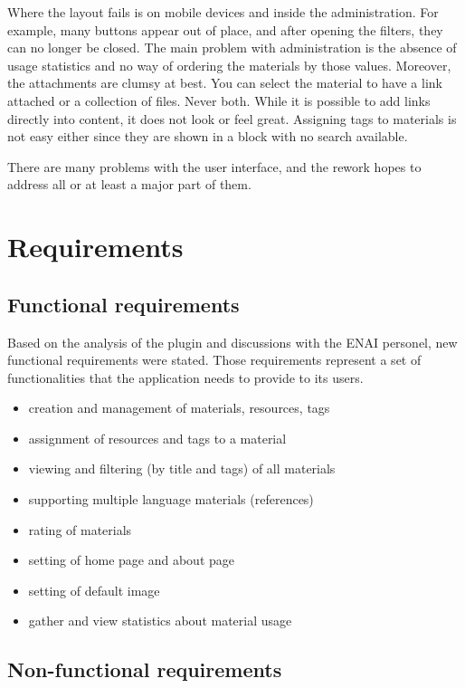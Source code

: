 \documentclass[
  digital,     %
  oneside,     %
  nosansbold,  %
  colorbold, %
  lof,         %
  lot,         %
]{fithesis4}
\begin{document}
Where the layout fails is on mobile devices and inside the administration. For example, many buttons appear out of place, and after opening the filters, they can no longer be closed. The main problem with administration is the absence of usage statistics and no way of ordering the materials by those values. Moreover, the attachments are clumsy at best. You can select the material to have a link attached or a collection of files. Never both. While it is possible to add links directly into content, it does not look or feel great. Assigning tags to materials is not easy either since they are shown in a block with no search available.

There are many problems with the user interface, and the rework hopes to address all or at least a major part of them.

\section{Requirements}

\subsection{Functional requirements}

Based on the analysis of the plugin and discussions with the ENAI personel, new functional requirements were stated. Those requirements represent a set of functionalities that the application needs to provide to its users.

\begin{itemize}
    \item creation and management of materials, resources, tags
    \item assignment of resources and tags to a material
    \item viewing and filtering (by title and tags) of all materials
    \item supporting multiple language materials (references)
    \item rating of materials
    \item setting of home page and about page
    \item setting of default image
    \item gather and view statistics about material usage
\end{itemize}

\subsection{Non-functional requirements}
\end{document}
